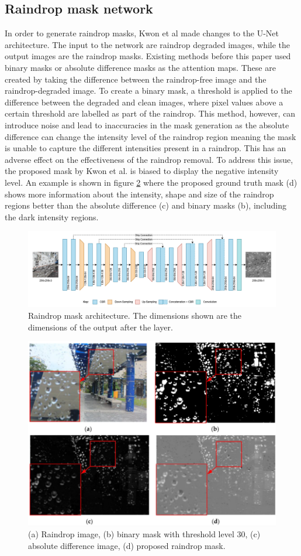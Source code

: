 \documentclass[11pt]{ociamthesis}  %
\begin{document}
\subsection{Raindrop mask network}
\label{Subsection:Raindrop mask network}
In order to generate raindrop masks, Kwon et al made changes to the U-Net architecture. The input to the network are raindrop degraded images, while the output images are the raindrop masks. Existing methods before this paper used binary masks or absolute difference masks as the attention maps. These are created by taking the difference between the raindrop-free image and the raindrop-degraded image. To create a binary mask, a threshold is applied to the difference between the degraded and clean images, where pixel values above a certain threshold are labelled as part of the raindrop. This method, however, can introduce noise and lead to inaccuracies in the mask generation as the absolute difference can change the intensity level of the raindrop region meaning the mask is unable to capture the different intensities present in a raindrop. This has an adverse effect on the effectiveness of the raindrop removal. To address this issue, the proposed mask by Kwon et al. is biased to display the negative intensity level. An example is shown in figure \ref{fig:Raindrop masks} where the proposed ground truth mask (d) shows more information about the intensity, shape and size of the raindrop regions better than the absolute difference (c) and binary masks (b), including the dark intensity regions.

\begin{figure}
    \centering
    \includegraphics[width=0.8\linewidth]{figures/Kwon-et-al-Raindrop-Mask-Architecture.png}
    \caption{Raindrop mask architecture. The dimensions shown are the dimensions of the output after the layer.}
    \label{fig:Raindrop mask architecture}
\end{figure}

\begin{figure}
    \centering
    \includegraphics[width=0.5\linewidth]{figures/Kwon-et-al-Raindrop-Masks.png}
    \caption{(a) Raindrop image, (b) binary mask with threshold level 30, (c) absolute difference image, (d) proposed raindrop mask.}
    \label{fig:Raindrop masks}
\end{figure}
\end{document}
